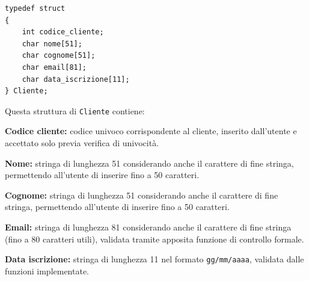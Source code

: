 \documentclass[11pt,a4paper,oneside,openany]{book}
\newenvironment{listacomp}{%
    \small
    \begin{list}{\textendash}{%
        \setlength{\topsep}{2pt}%
        \setlength{\partopsep}{0pt}%
        \setlength{\itemsep}{1pt}%
        \setlength{\parsep}{0pt}%
        \setlength{\leftmargin}{1.2em}%
    }%
}{%
    \end{list}%
}
\begin{document}
\vspace{0.2cm}
\begin{samepage}
\begin{lstlisting}[caption={Definizione della struttura Cliente}]
typedef struct
{
    int codice_cliente;
    char nome[51];
    char cognome[51];
    char email[81];
    char data_iscrizione[11];
} Cliente;
\end{lstlisting}
Questa struttura di \texttt{Cliente} contiene:
\begin{listacomp}
    \item \textbf{Codice cliente:} codice univoco corrispondente al cliente, inserito dall'utente e accettato solo previa verifica di univocità.
    \item \textbf{Nome:} stringa di lunghezza 51 considerando anche il carattere di fine stringa, permettendo all'utente di inserire fino a 50 caratteri.
    \item \textbf{Cognome:} stringa di lunghezza 51 considerando anche il carattere di fine stringa, permettendo all'utente di inserire fino a 50 caratteri.
    \item \textbf{Email:} stringa di lunghezza 81 considerando anche il carattere di fine stringa (fino a 80 caratteri utili), validata tramite apposita funzione di controllo formale.
    \item \textbf{Data iscrizione:} stringa di lunghezza 11 nel formato \texttt{gg/mm/aaaa}, validata dalle funzioni implementate.
\end{listacomp}
\end{samepage}
\end{document}
